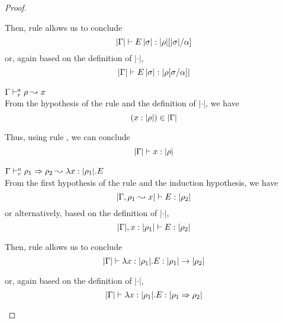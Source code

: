 \begin{proof}
\begin{description}
  Then, rule  allows us to conclude
\begin{equation*}
  |\Gamma| \vdash E\,|\sigma| : |\rho|[|\sigma|/\alpha]
\end{equation*}
  or, again based on the definition of $|\cdot|$,
\begin{equation*}
  |\Gamma| \vdash E\,|\sigma| : |\rho[\sigma/\alpha]|
\end{equation*}

\item[\fbox{\texttt{(AR-IVar)}}]\quad$\Gamma \vdash^a_{r} \rho \leadsto x$ \ \\

  From the hypothesis of the rule and the definition of $|\cdot|$, we have
\begin{equation*}
  (x : |\rho|) \in |\Gamma|
\end{equation*}

  Thus, using rule , we can conclude
\begin{equation*}
  |\Gamma| \vdash x : |\rho|
\end{equation*}

\item[\fbox{\texttt{(AR-IAbs)}}]\quad$\Gamma \vdash^a_{r} \rho_1 \Rightarrow \rho_2 \leadsto \lambda x:|\rho_1|.E$ \ \\

  From the first hypothesis of the rule and the induction hypothesis, we have
\begin{equation*}
  |\Gamma, \rho_1 \leadsto x| \vdash E : |\rho_2|
\end{equation*}
  or alternatively, based on the definition of $|\cdot|$,
\begin{equation*}
  |\Gamma|, x : |\rho_1| \vdash E : |\rho_2|
\end{equation*}

  Then, rule  allows us to conclude
\begin{equation*}
  |\Gamma| \vdash \lambda x:|\rho_1|.E : |\rho_1| \rightarrow |\rho_2|
\end{equation*}

  or, again based on the definition of $|\cdot|$,
\begin{equation*}
  |\Gamma| \vdash \lambda x:|\rho_1|.E : |\rho_1 \Rightarrow \rho_2|
\end{equation*}


\end{description}
\end{proof}
